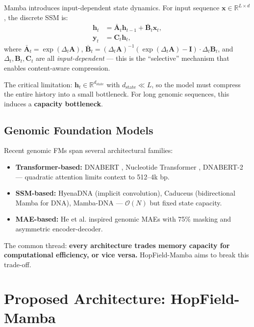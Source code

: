 \documentclass[11pt,a4paper]{article}
\numberwithin{equation}{section}
\newcommand{\R}{\mathbb{R}}
\begin{document}
Mamba \cite{gu2023mamba} introduces input-dependent state dynamics. For input
sequence $\bm{x} \in \R^{L \times d}$, the discrete SSM is:
\begin{align}
    \bm{h}_t &= \bar{\bm{A}}_t \bm{h}_{t-1} + \bar{\bm{B}}_t \bm{x}_t, \\
    \bm{y}_t &= \bm{C}_t \bm{h}_t,
\end{align}
where $\bar{\bm{A}}_t = \exp(\Delta_t \bm{A})$, $\bar{\bm{B}}_t = (\Delta_t \bm{A})^{-1}
(\exp(\Delta_t \bm{A}) - \bm{I}) \cdot \Delta_t \bm{B}_t$, and
$\Delta_t, \bm{B}_t, \bm{C}_t$ are all \emph{input-dependent} --- this is the
``selective'' mechanism that enables content-aware compression.

The critical limitation: $\bm{h}_t \in \R^{d_{\text{state}}}$ with $d_{\text{state}} \ll L$,
so the model must compress the entire history into a small bottleneck. For long genomic
sequences, this induces a \textbf{capacity bottleneck}.

\subsection{Genomic Foundation Models}

Recent genomic FMs span several architectural families:

\begin{itemize}
    \item \textbf{Transformer-based:} DNABERT \cite{ji2021dna}, Nucleotide Transformer
    \cite{dallatorre2023nucleotide}, DNABERT-2 --- quadratic attention limits context to
    512--4k bp.
    \item \textbf{SSM-based:} HyenaDNA \cite{nguyen2023hyenadna} (implicit convolution),
    Caduceus \cite{schiff2024caduceus} (bidirectional Mamba for DNA), Mamba-DNA ---
    $\mathcal{O}(N)$ but fixed state capacity.
    \item \textbf{MAE-based:} He et al. \cite{he2022masked} inspired genomic MAEs
    \cite{safari2025enhancing} with 75\% masking and asymmetric encoder-decoder.
\end{itemize}

The common thread: \textbf{every architecture trades memory capacity for computational
efficiency, or vice versa.} HopField-Mamba aims to break this trade-off.

\section{Proposed Architecture: HopField-Mamba}
\label{sec:architecture}
\end{document}

